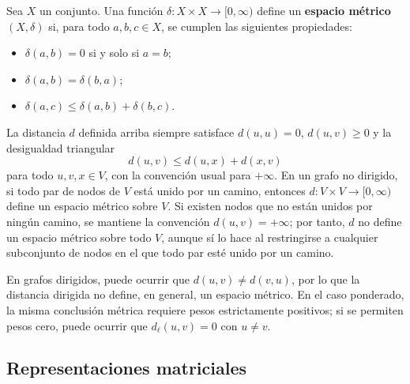             \begin{observacion}
                Sea $X$ un conjunto. Una función $\delta:X\times X\to[0,\infty)$ define un \textbf{espacio métrico} $(X,\delta)$ si, para todo $a,b,c\in X$, se cumplen las siguientes propiedades:
                \begin{itemize}
                    \item $\delta(a,b)=0$ si y solo si $a=b$;
                    \item $\delta(a,b)=\delta(b,a)$;
                    \item $\delta(a,c)\le \delta(a,b)+\delta(b,c)$.
                \end{itemize}

                La distancia $d$ definida arriba siempre satisface $d(u,u)=0$, $d(u,v)\ge 0$ y la desigualdad triangular
                \[
                    d(u,v)\le d(u,x)+d(x,v)
                \]
                para todo $u,v,x\in V$, con la convención usual para $+\infty$. En un grafo no dirigido, si todo par de nodos de $V$ está unido por un camino, entonces $d:V\times V\to[0,\infty)$ define un espacio métrico sobre $V$. Si existen nodos que no están unidos por ningún camino, se mantiene la convención $d(u,v)=+\infty$; por tanto, $d$ no define un espacio métrico sobre todo $V$, aunque sí lo hace al restringirse a cualquier subconjunto de nodos en el que todo par esté unido por un camino.

                En grafos dirigidos, puede ocurrir que $d(u,v)\neq d(v,u)$, por lo que la distancia dirigida no define, en general, un espacio métrico. En el caso ponderado, la misma conclusión métrica requiere pesos estrictamente positivos; si se permiten pesos cero, puede ocurrir que $d_\ell(u,v)=0$ con $u\neq v$.
            \end{observacion}

        \subsection{Representaciones matriciales}

